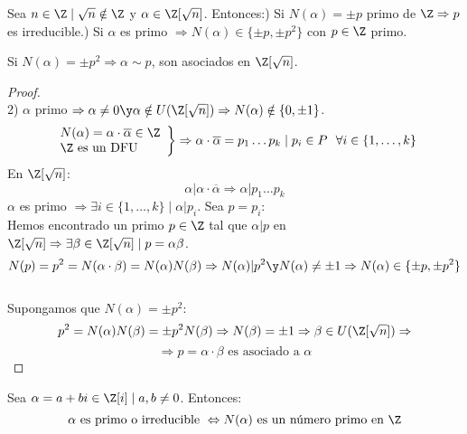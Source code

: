 \begin{prop}
    Sea $n \in \Z \mid \sqrt{n} \notin \Z$ y $\alpha \in \Z[\sqrt{n}]$. Entonces:) Si $N(\alpha) = \pm p$ primo de $\Z \Rightarrow p$ es irreducible.) Si $\alpha$ es primo $\Rightarrow N(\alpha) \in \{\pm p, \pm p^2\}$ con $p \in \Z$ primo.\par
    Si $N(\alpha)=\pm p^2 \Rightarrow \alpha \sim p$, son asociados en $\Z[\sqrt{n}]$.
\begin{proof}
    \ \\

    
    2) $\alpha$ primo $\Rightarrow \alpha \neq 0 \y \alpha \notin U(\Z[\sqrt{n}]) \Rightarrow N(\alpha) \notin \{0, \pm 1\}$.
    $$\left. \begin{array}{l}
            N(\alpha) = \alpha \cdot \overline{\alpha} \in \Z \\
            \Z \mbox{ es un DFU}
        \end{array} \right\} \Rightarrow \alpha \cdot \overline{\alpha} = p_1\ldots p_k \mid p_i \in P~~\forall i
        \in \{1, \ldots, k\}$$
    En $\Z[\sqrt{n}]$:
    $$\alpha|\alpha \cdot \overline{\alpha} \Rightarrow \alpha|p_1\ldots p_k$$
    $\alpha$ es primo $\Rightarrow \exists i \in \{1, \ldots, k\} \mid \alpha|p_i$. Sea $p = p_i$:\\

    
    Hemos encontrado un primo $p \in \Z$ tal que $\alpha|p$ en $\Z[\sqrt{n}] \Rightarrow \exists \beta \in \Z[\sqrt{n}] \mid
        p=\alpha \beta$.\newline
    $$N(p) = p^2 = N(\alpha\cdot \beta) = N(\alpha)N(\beta) \Rightarrow N(\alpha)|p^2 \y N(\alpha)\neq \pm 1 \Rightarrow
        N(\alpha) \in \{\pm p, \pm p^2\}$$
    \ \\

    
    Supongamos que $N(\alpha) = \pm p^2$:
    $$p^2 = N(\alpha)N(\beta) = \pm p^2 N(\beta) \Rightarrow N(\beta) = \pm 1 \Rightarrow \beta \in U(\Z[\sqrt{n}]) \Rightarrow$$
    $$\Rightarrow p = \alpha \cdot \beta \mbox{ es asociado a } \alpha$$
\end{proof}
\end{prop}

\begin{lema}
    Sea $\alpha = a+bi \in \Z[i] \mid a,b \neq 0$. Entonces:
    $$\alpha \mbox{ es primo o irreducible } \Leftrightarrow N(\alpha) \mbox{ es un número primo en } \Z$$
\end{lema}

